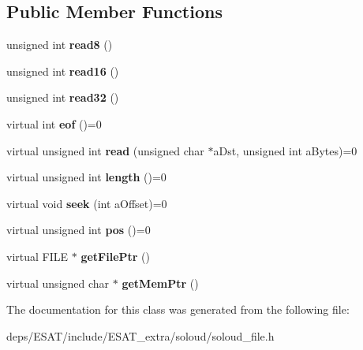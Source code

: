 \subsection*{Public Member Functions}
\begin{DoxyCompactItemize}
\item 
\mbox{\label{class_so_loud_1_1_file_a2b811550ddbfea1e1f33af18f26e15db}} 
unsigned int {\bfseries read8} ()
\item 
\mbox{\label{class_so_loud_1_1_file_afc03885cd3810bf6be24140be8907078}} 
unsigned int {\bfseries read16} ()
\item 
\mbox{\label{class_so_loud_1_1_file_a12225d0232f062979aca7ba02f6cd5c3}} 
unsigned int {\bfseries read32} ()
\item 
\mbox{\label{class_so_loud_1_1_file_ad396b449fdfc04b2a5def8d1ccf98b17}} 
virtual int {\bfseries eof} ()=0
\item 
\mbox{\label{class_so_loud_1_1_file_ad4c53f330a32d0af3d5e90d0add22274}} 
virtual unsigned int {\bfseries read} (unsigned char $\ast$a\+Dst, unsigned int a\+Bytes)=0
\item 
\mbox{\label{class_so_loud_1_1_file_aa25300482995ab849ca6e0115b9bd7bf}} 
virtual unsigned int {\bfseries length} ()=0
\item 
\mbox{\label{class_so_loud_1_1_file_a28078d314c7b390edd82469f7e4d75a4}} 
virtual void {\bfseries seek} (int a\+Offset)=0
\item 
\mbox{\label{class_so_loud_1_1_file_a619881eac4b1c7e0867d0924970bf916}} 
virtual unsigned int {\bfseries pos} ()=0
\item 
\mbox{\label{class_so_loud_1_1_file_a137ccbea0200f10f0e6f3c1314e5e0a6}} 
virtual F\+I\+LE $\ast$ {\bfseries get\+File\+Ptr} ()
\item 
\mbox{\label{class_so_loud_1_1_file_a620728769391db660d290c0433624683}} 
virtual unsigned char $\ast$ {\bfseries get\+Mem\+Ptr} ()
\end{DoxyCompactItemize}


The documentation for this class was generated from the following file\+:\begin{DoxyCompactItemize}
\item 
deps/\+E\+S\+A\+T/include/\+E\+S\+A\+T\+\_\+extra/soloud/soloud\+\_\+file.\+h\end{DoxyCompactItemize}
